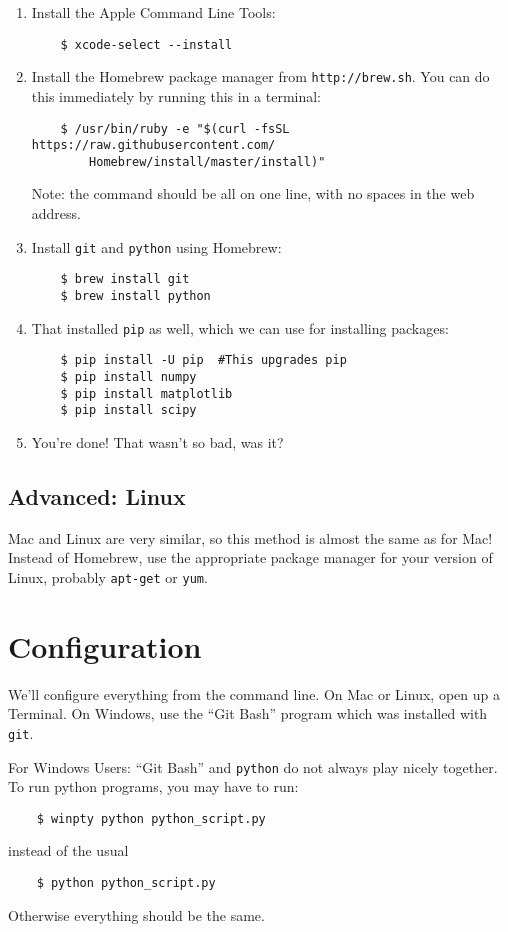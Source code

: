 \documentclass{article}
\newcommand{\git}{{\texttt{git}}}
\newcommand{\python}{{\texttt{python}}}
\begin{document}
\begin{enumerate}
	\item Install the Apple Command Line Tools: \begin{lstlisting}
	$ xcode-select --install
	\end{lstlisting}
	\item Install the Homebrew package manager from \texttt{http://brew.sh}.  You can do this immediately by running this in a terminal:
	\begin{lstlisting}
	$ /usr/bin/ruby -e "$(curl -fsSL https://raw.githubusercontent.com/
		Homebrew/install/master/install)"
	\end{lstlisting}
	Note: the command should be all on one line, with no spaces in the web address.
	\item Install \git{} and \python{} using Homebrew: \begin{lstlisting}
	$ brew install git
	$ brew install python
	\end{lstlisting}
	\item That installed \texttt{pip} as well, which we can use for installing packages: \begin{lstlisting}
	$ pip install -U pip  #This upgrades pip
	$ pip install numpy
	$ pip install matplotlib
	$ pip install scipy
	\end{lstlisting}
	\item You're done!  That wasn't so bad, was it?
\end{enumerate}
	
\subsection{Advanced: Linux}

	Mac and Linux are very similar, so this method is almost the same as for Mac!  Instead of Homebrew, use the appropriate package manager for your version of Linux, probably \texttt{apt-get} or \texttt{yum}.


	
\section{Configuration}

We'll configure everything from the command line.  On Mac or Linux, open up a Terminal. On Windows, use the ``Git Bash''  program which was installed with \git{}. 

For Windows Users: ``Git Bash'' and \python{} do not always play nicely together.  To run python programs, you may have to run:
 \begin{lstlisting}
	$ winpty python python_script.py
\end{lstlisting}
instead of the usual
 \begin{lstlisting}
	$ python python_script.py
\end{lstlisting} 
Otherwise everything should be the same.
\end{document}
